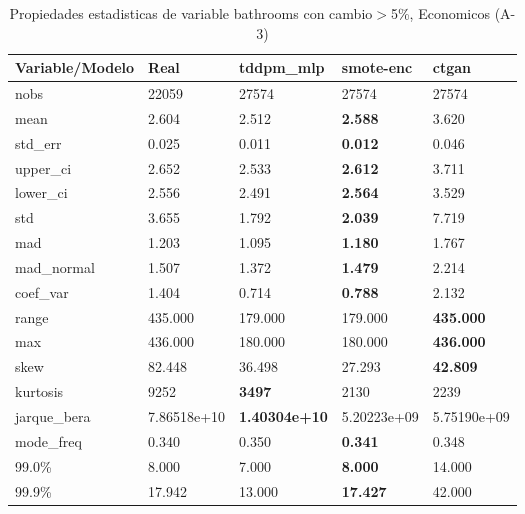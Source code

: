 \begin{table}[H]
\centering
\fontsize{8}{14}\selectfont
\caption{Propiedades estadisticas de variable bathrooms con cambio\ensuremath{>}5\%, Economicos (A-3)}
\label{table-stats-economicos-a-3-bathrooms-short}
\begin{tabular}{|l|m{10em}|m{10em}|m{10em}|m{10em}|}
\hline
 \rowcolor[gray]{0.8}
Variable/Modelo & Real & tddpm\_mlp & smote-enc & ctgan \\
\hline nobs & 22059 & 27574 & 27574 & 27574 \\
\hline mean & 2.604 & 2.512 & \bfseries 2.588 & \cellcolor[rgb]{0.9, 0.54, 0.52} 3.620 \\
\hline std\_err & 0.025 & 0.011 & \bfseries 0.012 & \cellcolor[rgb]{0.9, 0.54, 0.52} 0.046 \\
\hline upper\_ci & 2.652 & 2.533 & \bfseries 2.612 & \cellcolor[rgb]{0.9, 0.54, 0.52} 3.711 \\
\hline lower\_ci & 2.556 & 2.491 & \bfseries 2.564 & \cellcolor[rgb]{0.9, 0.54, 0.52} 3.529 \\
\hline std & 3.655 & 1.792 & \bfseries 2.039 & \cellcolor[rgb]{0.9, 0.54, 0.52} 7.719 \\
\hline mad & 1.203 & 1.095 & \bfseries 1.180 & \cellcolor[rgb]{0.9, 0.54, 0.52} 1.767 \\
\hline mad\_normal & 1.507 & 1.372 & \bfseries 1.479 & \cellcolor[rgb]{0.9, 0.54, 0.52} 2.214 \\
\hline coef\_var & 1.404 & 0.714 & \bfseries 0.788 & \cellcolor[rgb]{0.9, 0.54, 0.52} 2.132 \\
\hline range & 435.000 & \cellcolor[rgb]{0.9, 0.54, 0.52} 179.000 & \cellcolor[rgb]{0.9, 0.54, 0.52} 179.000 & \bfseries 435.000 \\
\hline max & 436.000 & \cellcolor[rgb]{0.9, 0.54, 0.52} 180.000 & \cellcolor[rgb]{0.9, 0.54, 0.52} 180.000 & \bfseries 436.000 \\
\hline skew & 82.448 & 36.498 & \cellcolor[rgb]{0.9, 0.54, 0.52} 27.293 & \bfseries 42.809 \\
\hline kurtosis & 9252 & \bfseries 3497 & \cellcolor[rgb]{0.9, 0.54, 0.52} 2130 & 2239 \\
\hline jarque\_bera & 7.86518e+10 & \bfseries 1.40304e+10 & \cellcolor[rgb]{0.9, 0.54, 0.52} 5.20223e+09 & 5.75190e+09 \\
\hline mode\_freq & 0.340 & \cellcolor[rgb]{0.9, 0.54, 0.52} 0.350 & \bfseries 0.341 & 0.348 \\
\hline 99.0\% & 8.000 & 7.000 & \bfseries 8.000 & \cellcolor[rgb]{0.9, 0.54, 0.52} 14.000 \\
\hline 99.9\% & 17.942 & 13.000 & \bfseries 17.427 & \cellcolor[rgb]{0.9, 0.54, 0.52} 42.000 \\
\hline
\end{tabular}
\end{table}

